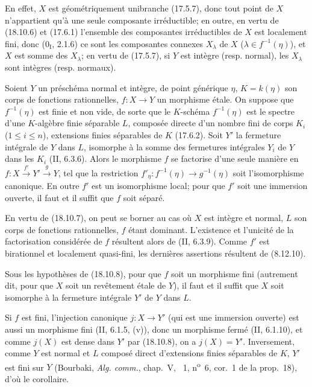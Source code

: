 En effet, $X$ est géométriquement unibranche (17.5.7), donc tout point de $X$ n'appartient qu'à une seule composante irréductible; en outre, en vertu de (18.10.6) et (17.6.1) l'ensemble des composantes irréductibles de $X$ est localement fini, donc ($0_{\mathrm I}$, 2.1.6) ce sont les composantes connexes $X_\lambda$ de $X$ ($\lambda\in f^{-1}(\eta)$), et $X$ est somme des $X_\lambda$; en vertu de (17.5.7), si $Y$ est intègre (resp. normal), les $X_\lambda$ sont intègres (resp. normaux).

\begin{proposition}[18.10.8]
\label{IV.18.10.8}
Soient $Y$ un préschéma normal et intègre, de point générique $\eta$, $K=k(\eta)$ son corps de fonctions rationnelles, $f:X\to Y$ un morphisme étale. On suppose que $f^{-1}(\eta)$ est finie et non vide, de sorte que le $K$-schéma $f^{-1}(\eta)$ est le spectre d'une $K$-algèbre finie séparable $L$, composée directe d'un nombre fini de corps $K_i$ ($1\leq i\leq n$), extensions finies séparables de $K$ (17.6.2). Soit $Y'$ la fermeture intégrale de $Y$ dans $L$, isomorphe à la somme des fermetures intégrales $Y_i$ de $Y$ dans les $K_i$ (II, 6.3.6). Alors le morphisme $f$ se factorise d'une seule manière en $f:X\xrightarrow{f'}Y'\xrightarrow{g}Y$, tel que la restriction $f'_\eta:f^{-1}(\eta)\to g^{-1}(\eta)$ soit l'isomorphisme canonique. En outre $f'$ est un isomorphisme local; pour que $f'$ soit une immersion ouverte, il faut et il suffit que $f$ soit séparé.
\end{proposition}

En vertu de (18.10.7), on peut se borner au cas où $X$ est intègre et normal, $L$ son corps de fonctions rationnelles, $f$ étant dominant. L'existence et l'unicité de la factorisation considérée de $f$ résultent alors de (II, 6.3.9). Comme $f'$ est birationnel et localement quasi-fini, les dernières assertions résultent de (8.12.10).

\begin{corollary}[18.10.9]
\label{IV.18.10.9}
Sous les hypothèses de (18.10.8), pour que $f$ soit un morphisme fini (autrement dit, pour que $X$ soit un revêtement étale de $Y$), il faut et il suffit que $X$ soit isomorphe à la fermeture intégrale $Y'$ de $Y$ dans $L$.
\end{corollary}

Si $f$ est fini, l'injection canonique $j:X\to Y'$ (qui est une immersion ouverte) est aussi un morphisme fini (II, 6.1.5, (v)), donc un morphisme fermé (II, 6.1.10), et comme $j(X)$ est dense dans $Y'$ par (18.10.8), on a $j(X)=Y'$. Inversement, comme $Y$ est normal et $L$ composé direct d'extensions finies séparables de $K$, $Y'$ est fini sur $Y$ (Bourbaki, \emph{Alg. comm.}, chap.~V, \textsection~1, n\textsuperscript{o}~6, cor.~1 de la prop.~18), d'où le corollaire.

